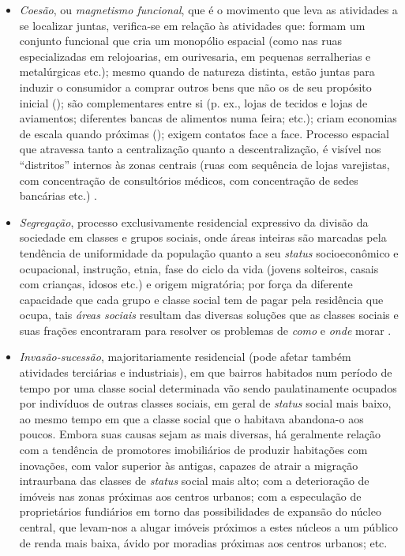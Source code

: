 \begin{itemize}
\item \textit{Coesão}, ou \textit{magnetismo funcional}, que é o movimento que leva as atividades a se localizar juntas, verifica-se em relação às atividades que: formam um conjunto funcional que cria um monopólio espacial (como nas ruas especializadas em relojoarias, em ourivesaria, em pequenas serralherias e metalúrgicas etc.); mesmo quando de natureza distinta, estão juntas para induzir o consumidor a comprar outros bens que não os de seu propósito inicial (); são complementares entre si (p. ex., lojas de tecidos e lojas de aviamentos; diferentes bancas de alimentos numa feira; etc.); criam economias de escala quando próximas (); exigem contatos face a face. Processo espacial que atravessa tanto a centralização quanto a descentralização, é visível nos ``distritos'' internos às zonas centrais (ruas com sequência de lojas varejistas, com concentração de consultórios médicos, com concentração de sedes bancárias etc.) \cite[p.~56-59]{CORREA1985espa}.
\item \textit{Segregação}, processo exclusivamente residencial expressivo da divisão da sociedade em classes e grupos sociais, onde áreas inteiras são marcadas pela tendência de uniformidade da população quanto a seu \textit{status} socioeconômico e ocupacional, instrução, etnia, fase do ciclo da vida (jovens solteiros, casais com crianças, idosos etc.) e origem migratória; por força da diferente capacidade que cada grupo e classe social tem de pagar pela residência que ocupa, tais \textit{áreas sociais} resultam das diversas soluções que as classes sociais e suas frações encontraram para resolver os problemas de \textit{como} e \textit{onde} morar \cite[p.~59-69]{CORREA1985espa}.
\item \textit{Invasão-sucessão}, majoritariamente residencial (pode afetar também atividades terciárias e industriais), em que bairros habitados num período de tempo por uma classe social determinada vão sendo paulatinamente ocupados por indivíduos de outras classes sociais, em geral de \textit{status} social mais baixo, ao mesmo tempo em que a classe social que o habitava abandona-o aos poucos. Embora suas causas sejam as mais diversas, há geralmente relação com a tendência de promotores imobiliários de produzir habitações com inovações, com valor superior às antigas, capazes de atrair a migração intraurbana das classes de \textit{status} social mais alto; com a deterioração de imóveis nas zonas próximas aos centros urbanos; com a especulação de proprietários fundiários em torno das possibilidades de expansão do núcleo central, que levam-nos a alugar imóveis próximos a estes núcleos a um público de renda mais baixa, ávido por moradias próximas aos centros urbanos; etc. \cite[p.~69-76]{CORREA1997}

\end{itemize}
